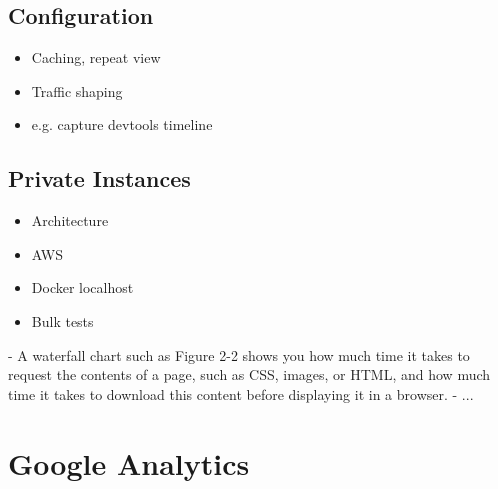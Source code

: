 \subsection{Configuration}


\begin{itemize}
\item Caching, repeat view
\item Traffic shaping
\item e.g. capture devtools timeline
\end{itemize}



\subsection{Private Instances}


\begin{itemize}
\item Architecture
\item AWS
\item Docker localhost
\item Bulk tests
\end{itemize}








- A waterfall chart such as Figure 2-2 shows you how much time it takes to request the contents of a page, such as CSS, images, or HTML, and how much time it takes to download this content before displaying it in a browser.
- ...














\section{Google Analytics}

